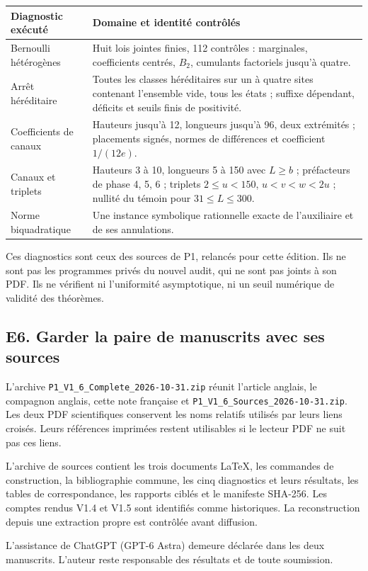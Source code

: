 \documentclass[11pt,a4paper]{article}
\begin{document}
\small
\begin{tabularx}{\textwidth}{@{}>{\raggedright\arraybackslash}p{}>{\raggedright\arraybackslash}X@{}}
\toprule
Diagnostic exécuté & Domaine et identité contrôlés\\
\midrule
Bernoulli hétérogènes
& Huit lois jointes finies, 112 contrôles : marginales, coefficients
centrés, \(B_2\), cumulants factoriels jusqu'à quatre.\\[5pt]
Arrêt héréditaire
& Toutes les classes héréditaires sur un à quatre sites contenant
l'ensemble vide, tous les états ; suffixe dépendant, déficits et
seuils finis de positivité.\\[5pt]
Coefficients de canaux
& Hauteurs jusqu'à 12, longueurs jusqu'à 96, deux extrémités ;
placements signés, normes de différences et coefficient \(1/(12e)\).\\[5pt]
Canaux et triplets
& Hauteurs 3 à 10, longueurs 5 à 150 avec \(L\ge b\) ; préfacteurs
de phase 4, 5, 6 ; triplets \(2\le u<150\), \(u<v<w<2u\) ;
nullité du témoin pour \(31\le L\le300\).\\[5pt]
Norme biquadratique
& Une instance symbolique rationnelle exacte de l'auxiliaire et de
ses annulations.\\
\bottomrule
\end{tabularx}
\normalsize

Ces diagnostics sont ceux des sources de P1, relancés pour cette
édition. Ils ne sont pas les programmes privés du nouvel audit,
qui ne sont pas joints à son PDF. Ils ne vérifient ni l'uniformité
asymptotique, ni un seuil numérique de validité des théorèmes.

\subsection*{E6. Garder la paire de manuscrits avec ses sources}
L'archive \nolinkurl{P1_V1_6_Complete_2026-10-31.zip} réunit
l'article anglais, le compagnon anglais, cette note française et
\nolinkurl{P1_V1_6_Sources_2026-10-31.zip}.
Les deux PDF scientifiques conservent les noms relatifs utilisés
par leurs liens croisés. Leurs références imprimées restent utilisables
si le lecteur PDF ne suit pas ces liens.

L'archive de sources contient les trois documents LaTeX, les commandes
de construction, la bibliographie commune, les cinq diagnostics et leurs
résultats, les tables de correspondance, les rapports ciblés et le
manifeste SHA-256. Les comptes rendus V1.4 et V1.5 sont identifiés
comme historiques. La reconstruction depuis une extraction propre
est contrôlée avant diffusion.

L'assistance de ChatGPT (GPT-6 Astra) demeure déclarée dans les deux
manuscrits. L'auteur reste responsable des résultats et de toute soumission.
\end{document}
